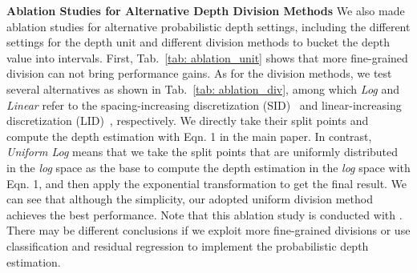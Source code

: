 \noindent\textbf{Ablation Studies for Alternative Depth Division Methods}\quad
We also made ablation studies for alternative probabilistic depth settings, including the different settings for the depth unit  and different division methods to bucket the depth value into intervals. First, Tab.~\ref{tab: ablation_unit} shows that more fine-grained division can not bring performance gains. As for the division methods, we test several alternatives as shown in Tab.~\ref{tab: ablation_div}, among which \emph{Log} and \emph{Linear} refer to the spacing-increasing discretization (SID)~\cite{DORN} and linear-increasing discretization (LID)~\cite{Center3D}, respectively. We directly take their split points and compute the depth estimation with Eqn. 1 in the main paper. In contrast, \emph{Uniform Log} means that we take the split points that are uniformly distributed in the \emph{log} space as the base to compute the depth estimation in the \emph{log} space with Eqn. 1, and then apply the exponential transformation to get the final result. We can see that although the simplicity, our adopted uniform division method achieves the best performance. Note that this ablation study is conducted with . There may be different conclusions if we exploit more fine-grained divisions or use classification and residual regression to implement the probabilistic depth estimation.

